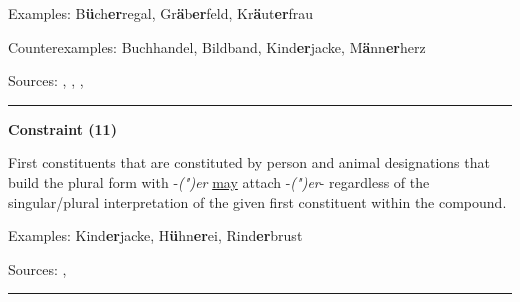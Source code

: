 \vspace{0.3em}

\noindent
Examples: B\textbf{ü}ch\textbf{er}regal, Gr\textbf{ä}b\textbf{er}feld, Kr\textbf{ä}ut\textbf{er}frau

\noindent
Counterexamples: Buch{\zeroLinker}handel, Bild{\zeroLinker}band, Kind\textbf{er}jacke, M\textbf{ä}nn\textbf{er}herz

\vspace{0.3em}

\noindent
Sources: \citet[229]{eisenberg_2013}, \citet[80, 81]{nuebling_szczepaniak_2013}, \citet[99]{ortner_mueller-bollhagen_1991}, \citet[29]{schaefer_pankratz_2018}


\hrule




\vspace{0.4em}

\begin{center}
\textbf{Constraint (11)}
\end{center}

\noindent
First constituents that are constituted by person and animal designations that build the plural form with -\textit{(")er} \underline{may} attach -\textit{(")er}- regardless of the singular/plural interpretation of the given first constituent within the compound.
\vspace{0.35em}


\vspace{0.3em}

\noindent
Examples: Kind\textbf{er}jacke, H\textbf{ü}hn\textbf{er}ei, Rind\textbf{er}brust

\vspace{0.3em}

\noindent
Sources: \citet[229]{eisenberg_2013}, \citet[98]{ortner_mueller-bollhagen_1991}


\hrule




\vspace{0.4em}

